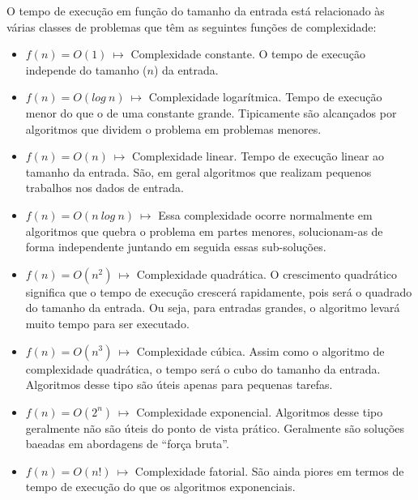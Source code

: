 \documentclass[11pt,fleqn]{book} %
\begin{document}
O tempo de execução em função do tamanho da entrada está relacionado às várias classes de problemas que têm as seguintes funções de complexidade:
\begin{itemize}
\item $f(n) = O(1)~\mapsto$ Complexidade constante. O tempo de execução independe do tamanho ($n$) da entrada.
\item $f(n) = O(log~n)~\mapsto$ Complexidade logarítmica. Tempo de execução menor do que o de uma constante grande. Tipicamente são alcançados por algoritmos que dividem o problema em problemas menores.
\item $f(n) = O(n)~\mapsto$ Complexidade linear. Tempo de execução linear ao tamanho da entrada. São, em geral algoritmos que realizam pequenos trabalhos nos dados de entrada.
\item $f(n) = O(n~log~n)~\mapsto$ Essa complexidade ocorre normalmente em algoritmos que quebra o problema em partes menores, solucionam-as de forma independente juntando em seguida essas sub-soluções.
\item $f(n) = O(n^2)~\mapsto$ Complexidade quadrática. O crescimento quadrático significa que o tempo de execução crescerá rapidamente, pois será o quadrado do tamanho da entrada. Ou seja, para entradas grandes, o algoritmo levará muito tempo para ser executado.
\item $f(n) = O(n^3)~\mapsto$ Complexidade cúbica. Assim como o algoritmo de complexidade quadrática,  o tempo será o cubo do tamanho da entrada. Algoritmos desse tipo são úteis apenas para pequenas tarefas.
\item $f(n) = O(2^n)~\mapsto$ Complexidade exponencial. Algoritmos desse tipo geralmente não são úteis do ponto de vista prático. Geralmente são soluções baeadas em abordagens de ``força bruta''.
\item $f(n) = O(n!)~\mapsto$ Complexidade fatorial. São ainda piores em termos de tempo de execução do que os algoritmos exponenciais.
\end{itemize}
\end{document}
